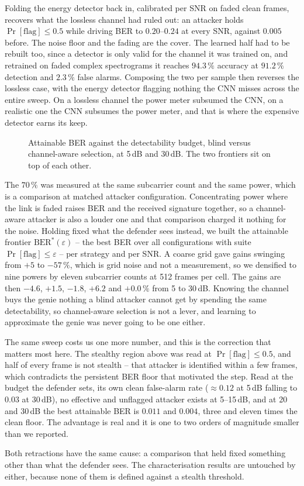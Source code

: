 Folding the energy detector back in, calibrated per SNR on faded clean frames, recovers what the
lossless channel had ruled out: an attacker holds $\Pr[\text{flag}] \leq 0.5$ while driving BER to
$0.20$--$0.24$ at every SNR, against $0.005$ before.
The noise floor and the fading are the cover.
The learned half had to be rebuilt too, since a detector is only valid for the channel it was trained
on, and retrained on faded complex spectrograms it reaches $94.3\,\%$ accuracy at $91.2\,\%$ detection
and $2.3\,\%$ false alarms.
Composing the two per sample then reverses the lossless case, with the energy detector flagging nothing
the CNN misses across the entire sweep.
On a lossless channel the power meter subsumed the CNN, on a realistic one the CNN subsumes the power
meter, and that is where the expensive detector earns its keep.

\begin{figure}[!t]
\centering
\caption{Attainable BER against the detectability budget, blind versus channel-aware selection, at
5\,dB and 30\,dB. The two frontiers sit on top of each other.}
\label{fig:matched}
\end{figure}

The $70\,\%$ was measured at the same subcarrier count and the same power, which is a comparison at
matched attacker configuration.
Concentrating power where the link is faded raises BER and the received signature together, so a
channel-aware attacker is also a louder one and that comparison charged it nothing for the noise.
Holding fixed what the defender sees instead, we built the attainable frontier
$\mathrm{BER}^*(\varepsilon)$ -- the best BER over all configurations with suite
$\Pr[\text{flag}] \leq \varepsilon$ -- per strategy and per SNR.
A coarse grid gave gains swinging from $+5$ to $-57\,\%$, which is grid noise and not a measurement, so
we densified to nine powers by eleven subcarrier counts at 512 frames per cell.
The gains are then $-4.6$, $+1.5$, $-1.8$, $+6.2$ and $+0.0\,\%$ from 5 to 30\,dB.
Knowing the channel buys the genie nothing a blind attacker cannot get by spending the same
detectability, so channel-aware selection is not a lever, and learning to approximate the genie was
never going to be one either.

The same sweep costs us one more number, and this is the correction that matters most here.
The stealthy region above was read at $\Pr[\text{flag}] \leq 0.5$, and half of every frame is not
stealth -- that attacker is identified within a few frames, which contradicts the persistent BER floor
that motivated the step.
Read at the budget the defender sets, its own clean false-alarm rate ($\approx 0.12$ at 5\,dB falling to
$0.03$ at 30\,dB), no effective and unflagged attacker exists at 5--15\,dB, and at 20 and 30\,dB the best
attainable BER is $0.011$ and $0.004$, three and eleven times the clean floor.
The advantage is real and it is one to two orders of magnitude smaller than we reported.

Both retractions have the same cause: a comparison that held fixed something other than what the
defender sees.
The characterisation results are untouched by either, because none of them is defined against a stealth
threshold.
